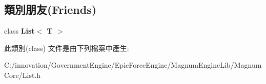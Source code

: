 \subsection*{類別朋友(Friends)}
\begin{DoxyCompactItemize}
\item 
class {\bfseries List$<$ T $>$}\hypertarget{class_i_dream_sky_1_1_link_adfa51a0eca1eba953f68ca3f65cdaa05}{}\label{class_i_dream_sky_1_1_link_adfa51a0eca1eba953f68ca3f65cdaa05}

\end{DoxyCompactItemize}


此類別(class) 文件是由下列檔案中產生\+:\begin{DoxyCompactItemize}
\item 
C\+:/innovation/\+Government\+Engine/\+Epic\+Force\+Engine/\+Magnum\+Engine\+Lib/\+Magnum\+Core/List.\+h\end{DoxyCompactItemize}
